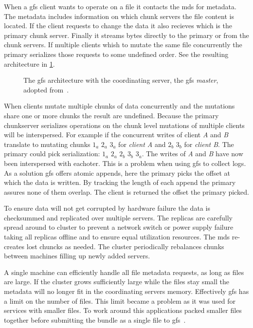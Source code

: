 When a \ac{gfs} client wants to operate on a file it contacts the \ac{mds} for metadata. The metadata includes information on which chunk servers the file content is located. If the client requests to change the data it also recieves which is the primary chunk server. Finally it streams bytes directly to the primary or from the chunk servers. If multiple clients whish to mutate the same file concurrently the primary serializes those requests to some undefined order. See the resulting architecture in \cref{fig:GFS_arch}.
%
\begin{figure}[htbp]
	\centering
	
	\caption{The \ac{gfs} architecture with the coordinating server, the \ac{gfs} \textit{master}, adopted from~\cite{GFS}.}
	\label{fig:GFS_arch}
\end{figure}
%
When clients mutate multiple chunks of data concurrently and the mutations share one or more chunks the result are undefined. Because the primary chunkserver serializes operations on the chunk level mutations of multiple clients will be interspersed. For example if the concurrent writes of client \textit{A} and \textit{B} translate to mutating chunks $1_a$ $2_a$ $3_a$ for \textit{client A} and $2_b$ $3_b$ for \textit{client B}. The primary could pick serialization: $1_a$ $2_a$ $2_b$ $3_b$ $3_a$. The writes of \textit{A} and \textit{B} have now been interspersed with eachoter. This is a problem when using \ac{gfs} to collect logs. As a solution \ac{gfs} offers atomic appends, here the primary picks the offset at which the data is written. By tracking the length of each append the primary assures none of them overlap. The client is returned the offset the primary picked.

To ensure data will not get corrupted by hardware failure the data is checksummed and replicated over multiple servers. The replicas are carefully spread around to cluster to prevent a network switch or power supply failure taking all replicas offline and to ensure equal utilization resources. The \ac{mds} re-creates lost chuncks as needed. The cluster periodically rebalances chunks between machines filling up newly added servers. 

A single machine can efficiently handle all file metadata requests, as long as files are large. If the cluster grows sufficiently large while the files stay small the metadata will no longer fit in the coordinating servers memory. Effectively \ac{gfs} has a limit on the number of files. This limit became a problem as it was used for services with smaller files. To work around this applications packed smaller files together before submitting the bundle as a single file to \ac{gfs}~\cite{GFS_interview}.

